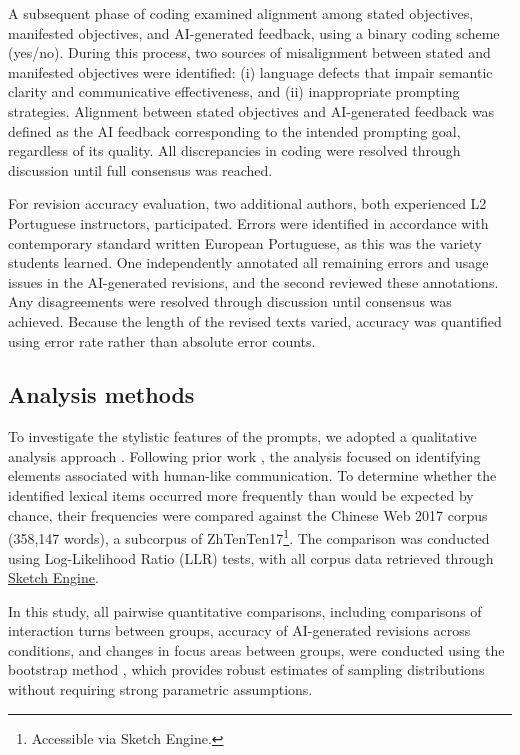 \documentclass[english]{textolivre}
\begin{document}
A subsequent phase of coding examined alignment among stated objectives, manifested objectives, and AI-generated feedback, using a binary coding scheme (yes/no). During this process, two sources of misalignment between stated and manifested objectives were identified: (i) language defects that impair semantic clarity and communicative effectiveness, and (ii) inappropriate prompting strategies. Alignment between stated objectives and AI-generated feedback was defined as the AI feedback corresponding to the intended prompting goal, regardless of its quality. All discrepancies in coding were resolved through discussion until full consensus was reached.

For revision accuracy evaluation, two additional authors, both experienced L2 Portuguese instructors, participated. Errors were identified in accordance with contemporary standard written European Portuguese, as this was the variety students learned. One independently annotated all remaining errors and usage issues in the AI-generated revisions, and the second reviewed these annotations. Any disagreements were resolved through discussion until consensus was achieved. Because the length of the revised texts varied, accuracy was quantified using error rate rather than absolute error counts.


\subsection{Analysis methods}\label{3.5}
To investigate the stylistic features of the prompts, we adopted a qualitative analysis approach \cite{hsieh2005three}. Following prior work \cite{zamfirescu2023johnny,KNOTH2024100225}, the analysis focused on identifying elements associated with human-like communication. To determine whether the identified lexical items occurred more frequently than would be expected by chance, their frequencies were compared against the Chinese Web 2017 corpus (358,147 words), a subcorpus of ZhTenTen17\footnote{Accessible via Sketch Engine.}. The comparison was conducted using Log-Likelihood Ratio (LLR) tests, with all corpus data retrieved through \href{https://www.sketchengine.eu/}{Sketch Engine}.

In this study, all pairwise quantitative comparisons, including comparisons of interaction turns between groups, accuracy of AI-generated revisions across conditions, and changes in focus areas between groups, were conducted using the bootstrap method \cite{Efron1992}, which provides robust estimates of sampling distributions without requiring strong parametric assumptions.
\end{document}
